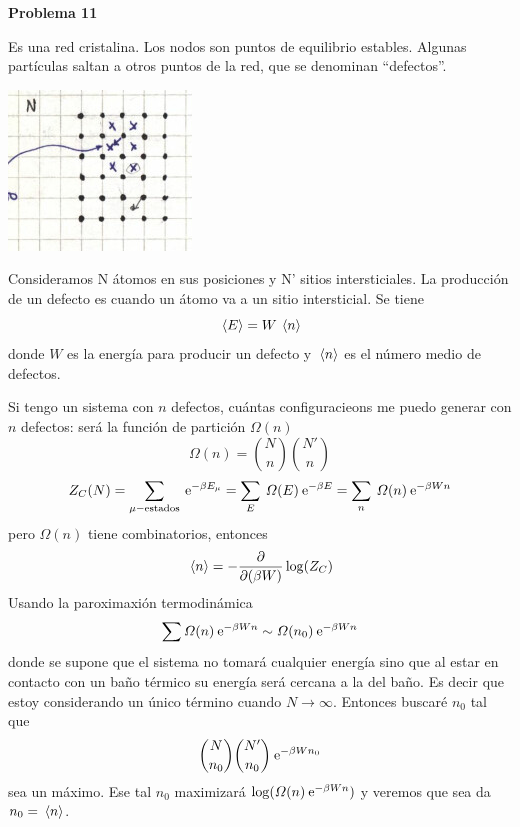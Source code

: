 \documentclass[10pt,oneside]{CBFT_book}
\begin{document}
\begin{ejemplo}{\bf Problema 11}

Es una red cristalina. Los nodos son puntos de equilibrio estables. Algunas partículas saltan a otros puntos
de la red, que se denominan ``defectos''.

\includegraphics[scale=0.5]{images/1606329496.jpg}

Consideramos N átomos en sus posiciones y N' sitios intersticiales.
La producción de un defecto es cuando un átomo va a un sitio intersticial.
Se tiene
\[
	\:\left\langle E \right\rangle = W \:\left\langle n \right\rangle
\]
donde $W$ es la energía para producir un defecto y $\:\left\langle n \right\rangle$ es el número medio de defectos.

Si tengo un sistema con $n$ defectos, cuántas configuracieons me puedo generar con $n$ defectos: será la
función de partición $ \Omega(n) $
\[
	\Omega(n) = \binom{N}{n} \binom{N'}{n}
\]
\[
	Z_C(N) = \sum_{\mu-\text{estados}} \:\mathrm{e}^{-\beta  E_\mu} =
	\sum_E \: \Omega(E) \:\mathrm{e}^{-\beta E} =
	\sum_n \: \Omega(n) \:\mathrm{e}^{-\beta W n}
\]
pero $\Omega(n)$ tiene combinatorios, entonces
\[
	\:\left\langle n \right\rangle = - \frac{\partial^{\hspace{-0.05em}} {}}{\partial {(\beta W)}^{\hspace{-0.05em}}}\log(Z_C)
\]
Usando la paroximaxión termodinámica
\[
	\sum \Omega(n) \:\mathrm{e}^{-\beta W n} \sim \Omega(n_0) \:\mathrm{e}^{-\beta W n}
\]
donde se supone que el sistema no tomará cualquier energía sino que al estar en contacto con un baño
térmico su energía será cercana a la del baño. Es decir que estoy considerando un único término cuando
$N \to \infty$.
Entonces buscaré $n_0$ tal que 
\[
	\binom{N}{n_0} \binom{N'}{n_0} \:\mathrm{e}^{ -\beta W n_0 }
\]
sea un máximo.
Ese tal $n_0$ maximizará $ \log ( \Omega(n) \:\mathrm{e}^{ -\beta W n }) $ y veremos que sea da $n_0 = \:\left\langle n \right\rangle$.
 
\end{ejemplo}
\end{document}
